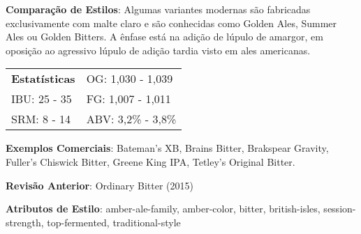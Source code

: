 \textbf{Comparação de Estilos}: Algumas variantes modernas são fabricadas exclusivamente com malte claro e são conhecidas como Golden Ales, Summer Ales ou Golden Bitters. A ênfase está na adição de lúpulo de amargor, em oposição ao agressivo lúpulo de adição tardia visto em ales americanas.

\begin{tabular}{@{}p{35mm}p{35mm}@{}}
  \textbf{Estatísticas} & OG: 1,030 - 1,039 \\
  IBU: 25 - 35  & FG: 1,007 - 1,011  \\
  SRM: 8 - 14  & ABV: 3,2\% - 3,8\%
\end{tabular}

\textbf{Exemplos Comerciais}: Bateman’s XB, Brains Bitter, Brakspear Gravity, Fuller's Chiswick Bitter, Greene King IPA, Tetley’s Original Bitter.

\textbf{Revisão Anterior}: Ordinary Bitter (2015)

\textbf{Atributos de Estilo}: amber-ale-family, amber-color, bitter, british-isles, session-strength, top-fermented, traditional-style